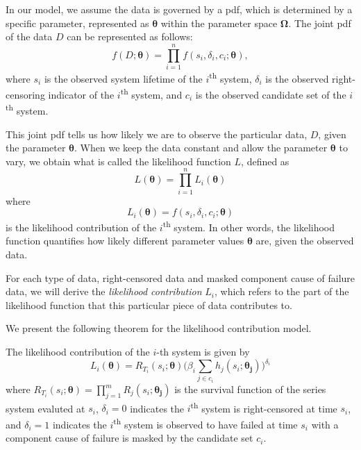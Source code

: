 \documentclass[
]{article}
\begin{document}
In our model, we assume the data is governed by a pdf, which is
determined by a specific parameter, represented as
\(\boldsymbol{\theta}\) within the parameter space
\(\boldsymbol{\Omega}\). The joint pdf of the data \(D\) can be
represented as follows: \[
f(D ; \boldsymbol{\theta}) = \prod_{i=1}^n f(s_i,\delta_i,c_i;\boldsymbol{\theta}),
\] where \(s_i\) is the observed system lifetime of the
\(i\)\textsuperscript{th} system, \(\delta_i\) is the observed
right-censoring indicator of the \(i\)\textsuperscript{th} system, and
\(c_i\) is the observed candidate set of the \(i\)\textsuperscript{th}
system.

This joint pdf tells us how likely we are to observe the particular
data, \(D\), given the parameter \(\boldsymbol{\theta}\). When we keep
the data constant and allow the parameter \(\boldsymbol{\theta}\) to
vary, we obtain what is called the likelihood function \(L\), defined as
\[
L(\boldsymbol{\theta}) = \prod_{i=1}^n L_i(\boldsymbol{\theta})
\] where \[
L_i(\boldsymbol{\theta}) = f(s_i,\delta_i,c_i;\boldsymbol{\theta})
\] is the likelihood contribution of the \(i\)\textsuperscript{th}
system. In other words, the likelihood function quantifies how likely
different parameter values \(\boldsymbol{\theta}\) are, given the
observed data.

For each type of data, right-censored data and masked component cause of
failure data, we will derive the \emph{likelihood contribution} \(L_i\),
which refers to the part of the likelihood function that this particular
piece of data contributes to.

We present the following theorem for the likelihood contribution model.

\begin{theorem}
\label{thm:likelihood_contribution}
The likelihood contribution of the $i$-th system is given by
\begin{equation}
\label{eq:like}
L_i(\boldsymbol{\theta}) = R_{T_i}(s_i;\boldsymbol{\theta}) \biggl(\beta_i \sum_{j \in c_i} h_j(s_i;\boldsymbol{\theta_j}) \biggr)^{\delta_i}
\end{equation}
where $R_{T_i}(s_i;\boldsymbol{\theta}) = \prod_{j=1}^m R_j(s_i;\boldsymbol{\theta_j})$
is the survival function of the series system evaluted at $s_i$, $\delta_i = 0$ indicates the
$i$\textsuperscript{th} system is
right-censored at time $s_i$, and $\delta_i = 1$ indicates the $i$\textsuperscript{th} system
is observed to have failed at time $s_i$ with a component cause of failure
is masked by the candidate set $c_i$.
\end{theorem}
\end{document}
